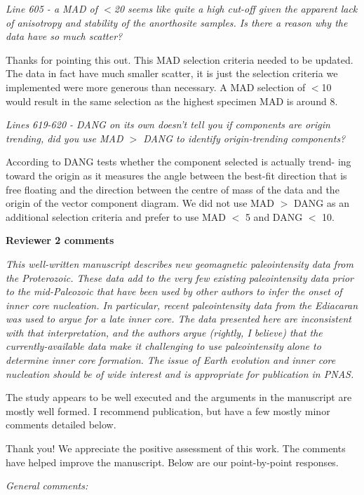 \documentclass[11pt, letterpaper]{article}
\begin{document}
\begin{flushleft}
\textit{Line 605 - a MAD of $<$20 seems like quite a high cut-off given the apparent lack of anisotropy and stability of the anorthosite samples. Is there a reason why the data have so much scatter?}

Thanks for pointing this out. This MAD selection criteria needed to be updated. The data in fact have much smaller scatter, it is just the selection criteria we implemented were more generous than necessary. A MAD selection of $<$10 would result in the same selection as the highest specimen MAD is around 8.

\textit{Lines 619-620 - DANG on its own doesn't tell you if components are origin trending, did you use MAD $>$ DANG to identify origin-trending components?}

According to \cite{Tauxe2004a} DANG tests whether the component selected is actually trend- ing toward the origin as it measures the angle between the best-fit direction that is free floating and the direction between the centre of mass of the data and the origin of the vector component diagram. We did not use MAD $>$ DANG as an additional selection criteria and prefer to use MAD $<$ 5 and DANG $<$ 10. 

\clearpage


\textbf{\Large Reviewer 2 comments}

\itshape
This well-written manuscript describes new geomagnetic paleointensity data from the Proterozoic. These data add to the very few existing paleointensity data prior to the mid-Paleozoic that have been used by other authors to infer the onset of inner core nucleation. In particular, recent paleointensity data from the Ediacaran was used to argue for a late inner core. The data presented here are inconsistent with that interpretation, and the authors argue (rightly, I believe) that the currently-available data make it challenging to use paleointensity alone to determine inner core formation. The issue of Earth evolution and inner core nucleation should be of wide interest and is appropriate for publication in PNAS.

The study appears to be well executed and the arguments in the manuscript are mostly well formed. I recommend publication, but have a few mostly minor comments detailed below.
\upshape

Thank you! We appreciate the positive assessment of this work. The comments have helped improve the manuscript. Below are our point-by-point responses.

\textit{General comments:}


\end{flushleft}
\end{document}
